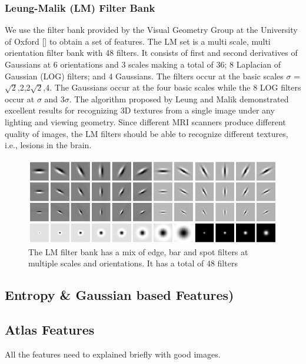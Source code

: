 \documentclass{article} %
\begin{document}
\subsubsection{Leung-Malik (LM) Filter Bank}
We use the filter bank provided by the Visual Geometry Group at the University of Oxford [] to obtain a set of features. The LM set is a multi scale, multi orientation filter bank with 48 filters. It consists of first and second derivatives of Gaussians at 6 orientations and 3 scales making a total of 36; 8 Laplacian of Gaussian (LOG) filters; and 4 Gaussians. The filters occur at the basic scales $\sigma$ = {$\sqrt{2}$,2,2$\sqrt{2}$,4}. The Gaussians occur at the four basic scales while the 8 LOG filters occur at $\sigma$ and 3$\sigma$. The algorithm proposed by Leung and Malik \cite{lmfilters} demonstrated excellent
results for recognizing 3D textures from a single image under any lighting and viewing geometry. Since different MRI scanners produce different quality of images, the LM filters should be able to recognize different textures, i.e., lesions in the brain.
\begin{figure}[h]
\centering
\includegraphics[scale=0.4]{lmfilters.jpg}
\caption{The LM filter bank has a mix of edge, bar and spot filters at multiple scales and orientations. It has a total of 48 filters}
\label{fig:LM filters}
\end{figure}

\subsection{Entropy \& Gaussian based Features)}

\subsection{Atlas Features}

All the features need to explained briefly with good images.

\end{document}
